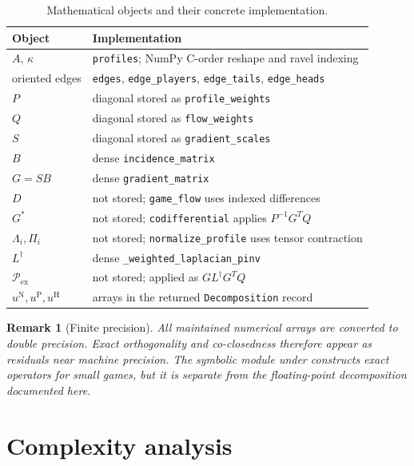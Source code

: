 \documentclass[11pt]{article}
\newtheorem{remark}{Remark}
\begin{document}
\begin{table}[htbp]
\centering
\caption{Mathematical objects and their concrete implementation.}
\label{tab:code-map}
\small
\begin{tabularx}{\textwidth}{@{}lX@{}}
\toprule
Object & Implementation \\
\midrule
$A$, $\kappa$ & \texttt{profiles}; NumPy C-order reshape and ravel indexing \\
oriented edges & \texttt{edges}, \texttt{edge\_players},
  \texttt{edge\_tails}, \texttt{edge\_heads} \\
$P$ & diagonal stored as \texttt{profile\_weights} \\
$Q$ & diagonal stored as \texttt{flow\_weights} \\
$S$ & diagonal stored as \texttt{gradient\_scales} \\
$B$ & dense \texttt{incidence\_matrix} \\
$G=SB$ & dense \texttt{gradient\_matrix} \\
$D$ & not stored; \texttt{game\_flow} uses indexed differences \\
$G^*$ & not stored; \texttt{codifferential} applies $P^{-1}G^TQ$ \\
$\Lambda_i,\Pi_i$ & not stored; \texttt{normalize\_profile} uses tensor contraction \\
$L^\dagger$ & dense \texttt{\_weighted\_laplacian\_pinv} \\
$\mathcal P_{\mathrm{ex}}$ & not stored; applied as $G L^\dagger G^TQ$ \\
$u^{\mathrm N},u^{\mathrm P},u^{\mathrm H}$ & arrays in the returned \texttt{Decomposition} record \\
\bottomrule
\end{tabularx}
\end{table}

\begin{remark}[Finite precision]
All maintained numerical arrays are converted to double precision.  Exact
orthogonality and co-closedness therefore appear as residuals near machine
precision.  The symbolic module under 
constructs exact operators for small games, but it is separate from the
floating-point decomposition documented here.
\end{remark}

\section{Complexity analysis}
\label{sec:complexity}
\end{document}
